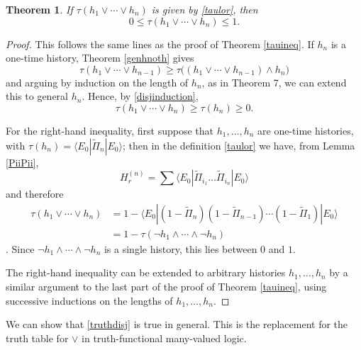 \documentclass[12pt,reqno]{article}
\renewcommand{\(}{\left(}
\renewcommand{\)}{\right)}
\newcommand{\<}{\langle}
\renewcommand{\>}{\rangle}
\newcommand{\Pii}{\widetilde{\Pi}}
\theoremstyle{plain} %
\newtheorem{thm}{Theorem}
\begin{document}
\begin{thm} If $\tau(h_1\lor\cdots\lor h_n)$ is given by \eqref{taulor}, then
\[
0 \le \tau(h_1\lor\cdots\lor h_n) \le 1.
\]
\end{thm}
\begin{proof}
This follows the same lines as the proof of Theorem \ref{tauineq}. If $h_n$ is a one-time history, Theorem \ref{genhnoth} gives
\[
\tau(h_1\lor\cdots\lor h_{n-1}) \ge \tau\big((h_1\lor\cdots\lor h_{n-1})\land h_n\big)
\]
and arguing by induction on the length of $h_n$, as in Theorem 7, we can extend this to general $h_n$. Hence, by \eqref{disjinduction},
\[
\tau(h_1\lor\cdots\lor h_n) \ge \tau(h_n) \ge 0.
\]

For the right-hand inequality, first suppose that $h_1,\ldots,h_n$ are one-time histories, with $\tau(h_n) = \<E_0|\Pii_n|E_0\>$; then in the definition \eqref{taulor} we have, from Lemma \ref{PiiPii},
\[
H_r^{(n)} = \sum \<E_0|\Pii_{i_1}\ldots \Pii_{i_n}|E_0\>
\]
and therefore
\begin{align*}
\tau(h_1\lor\cdots\lor h_n) &= 1 - \<E_0|(1 - \Pii_n)(1 - \Pii_{n-1})\cdots(1-\Pii_1)|E_0\>\\
&= 1 - \tau(\lnot h_1\land\cdots\land\lnot h_n)
\end{align*}.
Since $\lnot h_1\land\cdots\land\lnot h_n$ is a single history, this lies between $0$ and $1$.

The right-hand inequality can be extended to arbitrary histories $h_1,\ldots,h_n$ by a similar argument to the last part of the proof of Theorem \ref{tauineq}, using successive inductions on the lengths of $h_1,\ldots,h_n$.
\end{proof}

We can show that \eqref{truthdisj} is true in general. This is the replacement for the truth table for $\lor$ in truth-functional many-valued logic.
\end{document}
